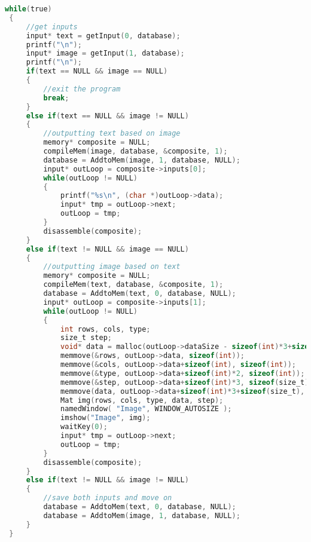 \documentclass{report}
\begin{document}
\begin{lstlisting}[language=C]
while(true)
 {
     //get inputs
     input* text = getInput(0, database);
     printf("\n");
     input* image = getInput(1, database);
     printf("\n");
     if(text == NULL && image == NULL)
     {
         //exit the program
         break;
     }
     else if(text == NULL && image != NULL)
     {
         //outputting text based on image
         memory* composite = NULL;
         compileMem(image, database, &composite, 1);
         database = AddtoMem(image, 1, database, NULL);
         input* outLoop = composite->inputs[0];
         while(outLoop != NULL)
         {
             printf("%s\n", (char *)outLoop->data);
             input* tmp = outLoop->next;
             outLoop = tmp;
         }
         disassemble(composite);
     }
     else if(text != NULL && image == NULL)
     {
         //outputting image based on text
         memory* composite = NULL;
         compileMem(text, database, &composite, 1);
         database = AddtoMem(text, 0, database, NULL);
         input* outLoop = composite->inputs[1];
         while(outLoop != NULL)
         {
             int rows, cols, type;
             size_t step;
             void* data = malloc(outLoop->dataSize - sizeof(int)*3+sizeof(size_t));
             memmove(&rows, outLoop->data, sizeof(int));
             memmove(&cols, outLoop->data+sizeof(int), sizeof(int));
             memmove(&type, outLoop->data+sizeof(int)*2, sizeof(int));
             memmove(&step, outLoop->data+sizeof(int)*3, sizeof(size_t));
             memmove(data, outLoop->data+sizeof(int)*3+sizeof(size_t), outLoop->dataSize - sizeof(int)*3+sizeof(size_t));
             Mat img(rows, cols, type, data, step);
             namedWindow( "Image", WINDOW_AUTOSIZE );
             imshow("Image", img);
             waitKey(0);
             input* tmp = outLoop->next;
             outLoop = tmp;
         }
         disassemble(composite);
     }
     else if(text != NULL && image != NULL)
     {
         //save both inputs and move on
         database = AddtoMem(text, 0, database, NULL);
         database = AddtoMem(image, 1, database, NULL);
     }
 }
\end{lstlisting}
\end{document}
